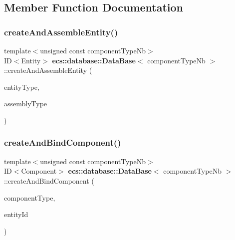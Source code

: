 \subsection{Member Function Documentation}
\label{classecs_1_1database_1_1_data_base_ad7cea6e99447ea681b8d8a666d13c134} 
\subsubsection{create\+And\+Assemble\+Entity()}
{\footnotesize\ttfamily template$<$unsigned const component\+Type\+Nb$>$ \\
ID$<$Entity$>$ {\bf ecs\+::database\+::\+Data\+Base}$<$ component\+Type\+Nb $>$\+::create\+And\+Assemble\+Entity (\begin{DoxyParamCaption}\item[{Entity\+Type const}]{entity\+Type,  }\item[{Assembly\+Type const}]{assembly\+Type }\end{DoxyParamCaption})}

\label{classecs_1_1database_1_1_data_base_a3cea49d97f99fbda75268c9ed979f4b8} 
\subsubsection{create\+And\+Bind\+Component()}
{\footnotesize\ttfamily template$<$unsigned const component\+Type\+Nb$>$ \\
ID$<$Component$>$ {\bf ecs\+::database\+::\+Data\+Base}$<$ component\+Type\+Nb $>$\+::create\+And\+Bind\+Component (\begin{DoxyParamCaption}\item[{Component\+Type const}]{component\+Type,  }\item[{ID$<$ Entity $>$ const \&}]{entity\+Id }\end{DoxyParamCaption})}

\label{classecs_1_1database_1_1_data_base_a6eb3c212e7e7b4accfe167c0606a4c0a} 

